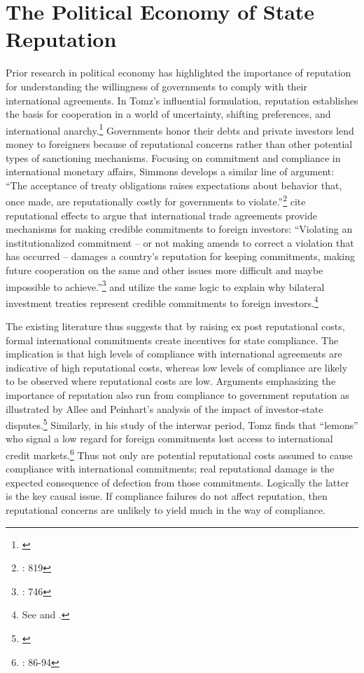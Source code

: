 \documentclass[12pt,onesided]{amsart}
\begin{document}
\section*{The Political Economy of State Reputation}

Prior research in political economy has highlighted the importance of reputation for understanding the willingness of governments to comply with their international agreements. In Tomz's influential formulation, reputation establishes the basis for cooperation in a world of uncertainty, shifting preferences, and international anarchy.\footnote{\citet{tomz:2007}} Governments honor their debts and private investors lend money to foreigners because of reputational concerns rather than other potential types of sanctioning mechanisms. Focusing on commitment and compliance in international monetary affairs, Simmons develops a similar line of argument: ``The acceptance of treaty obligations raises expectations about behavior that, once made, are reputationally costly for governments to violate.''\footnote{\citet{simmons:2000}: 819} \citeauthor{buthe:milner:2008} cite reputational effects to argue that international trade agreements provide mechanisms for making credible commitments to foreign investors: ``Violating an institutionalized commitment -- or not making amends to correct a violation that has occurred -- damages a country's reputation for keeping commitments, making future cooperation on the same and other issues more difficult and maybe impossible to achieve.''\footnote{\citet{buthe:milner:2008}: 746}  \citeauthor{buthe:milner:2009} and \citeauthor{elkins:etal:2006} utilize the same logic to explain why bilateral investment treaties represent credible commitments to foreign investors.\footnote{See \citet{buthe:milner:2009} and \citet{elkins:etal:2006}.}

The existing literature thus suggests that by raising ex post reputational costs, formal international commitments create incentives for state compliance. The implication is that high levels of compliance with international agreements are indicative of high reputational costs, whereas low levels of compliance are likely to be observed where reputational costs are low. Arguments emphasizing the importance of reputation also run from compliance to government reputation as illustrated by Allee and Peinhart's analysis of the impact of investor-state disputes.\footnote{\citet{allee:peinhardt:2011}} Similarly, in his study of the interwar period, Tomz finds that ``lemons'' who signal a low regard for foreign commitments lost access to international credit markets.\footnote{\citet{tomz:2007}: 86-94} Thus not only are potential reputational costs assumed to cause compliance with international commitments; real reputational damage is the expected consequence of defection from those commitments. Logically the latter is the key causal issue. If compliance failures do not affect reputation, then reputational concerns are unlikely to yield much in the way of compliance.
\end{document}
